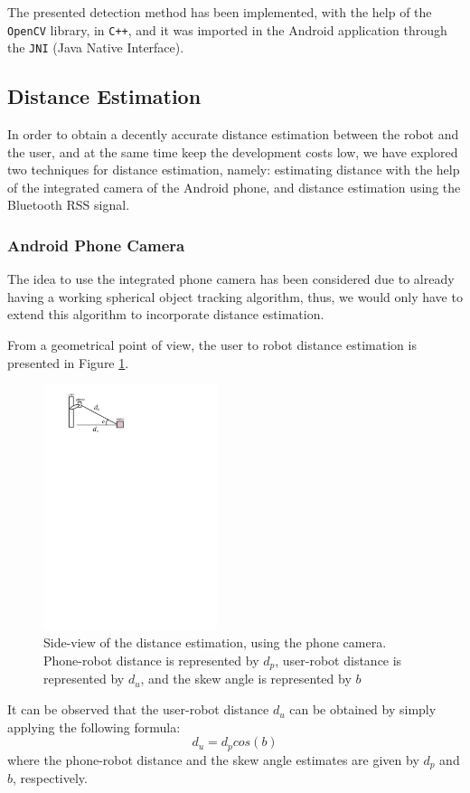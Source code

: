 \documentclass[journal]{IEEEtran}
\let\MYoriglatexcaption\caption
\renewcommand{\caption}[2][\relax]{\MYoriglatexcaption[#2]{#2}}
\begin{document}
The presented detection method has been implemented, with the help of the \texttt{OpenCV} library, in \texttt{C++}, and it was imported in the Android application through the \texttt{JNI} (Java Native Interface).

\subsection{Distance Estimation}
In order to obtain a decently accurate distance estimation between the robot and the user, and at the same time keep the development costs low, we have explored two techniques for distance estimation, namely: estimating distance with the help of the integrated camera of the Android phone, and distance estimation using the Bluetooth RSS signal.

\subsubsection{Android Phone Camera}
The idea to use the integrated phone camera has been considered due to already having a working spherical object tracking algorithm, thus, we would only have to extend this algorithm to incorporate distance estimation.

From a geometrical point of view, the user to robot distance estimation is presented in Figure \ref{fig:dist_camera}.
\begin{figure}[!htpb]
\centering
\includegraphics[width=2in]{images/distance_meas}
\caption{Side-view of the distance estimation, using the phone camera. Phone-robot distance is represented by $d_p$, user-robot distance is represented by $d_u$, and the skew angle is represented by $b$}
\label{fig:dist_camera}
\end{figure}

It can be observed that the user-robot distance $d_u$ can be obtained by simply applying the following formula:
\begin{equation}
d_u=d_pcos(b)
\end{equation}
where the phone-robot distance and the skew angle estimates are given by $d_p$ and $b$, respectively.
\end{document}
